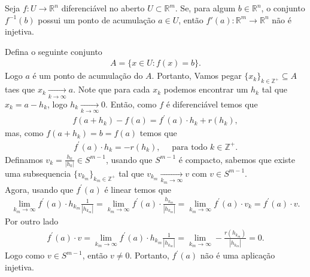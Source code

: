 \begin{homeworkProblem}[Seção 1-6]
  Seja $f : U \to \mathbb{R}^n$ diferenciável no aberto $U \subset \mathbb{R}^m$. Se, para algum $b \in \mathbb{R}^n$, o conjunto $f^{-1}(b)$ possui um ponto de acumulação $a \in U$, então $f'(a):\mathbb{R}^m \to \mathbb{R}^n$ não é injetiva.
  \begin{solution}
    Defina o seguinte conjunto
    \begin{align*}
      A=\{x\in U:f(x)=b\}.
    \end{align*}
    Logo $a$ é um ponto de acumulação do $A$.
    Portanto, Vamos pegar $\{x_k\}_{k\in\mathbb{Z}^{+}}\subseteq A$ taes que $x_k\xrightarrow[k\to\infty]{}a$. Note que para cada $x_k$ podemos encontrar um $h_k$ tal que $x_k=a-h_k$, logo $h_k\xrightarrow[k\to\infty]{}0$. Então, como $f$ é diferenciável temos que
    \begin{align*}
      f(a+h_k)-f(a)=f^{\prime}(a)\cdot h_k+r(h_k),
    \end{align*}
    mas, como $f(a+h_k)=b=f(a)$ temos que
    \begin{align*}
      f^{\prime}(a)\cdot h_k=-r(h_k),\quad\text{ para todo }k\in\mathbb{Z}^{+}.
    \end{align*}
    Definamos $v_k=\frac{h_k}{|h_k|}\in S^{m-1}$, usando que $S^{m-1}$ é compacto, sabemos que existe uma subsequencia $\{v_{k_m}\}_{k_m\in\mathbb{Z}^{+}}$ tal que $v_{k_m}\xrightarrow[k_m\to\infty]{}v$ com $v\in S^{m-1}$.\\
    Agora, usando que $f^{\prime}(a)$ é linear temos que
    \begin{align*}
      \lim_{k_m \to \infty}f^{\prime}(a)\cdot h_{k_m}\frac{1}{|h_{k_m}|}=\lim_{k_m \to \infty}f^{\prime}(a)\cdot \frac{h_{k_m}}{|h_{k_m}|}=\lim_{k_m \to \infty}f^{\prime}(a)\cdot v_k=f^{\prime}(a)\cdot v.
    \end{align*}
    Por outro lado
    \begin{align*}
      f^{\prime}(a)\cdot v=\lim_{k_m \to \infty}f^{\prime}(a)\cdot h_{k_m}\frac{1}{|h_{k_m}|}=\lim_{k_m \to \infty}-\frac{r(h_{k_m})}{|h_{k_m}|}=0.
    \end{align*}
    Logo como $v\in S^{m-1}$, então $v\neq 0$. Portanto, $f^{\prime}(a)$ não é uma aplicação injetiva. 
  \end{solution}
\end{homeworkProblem}
